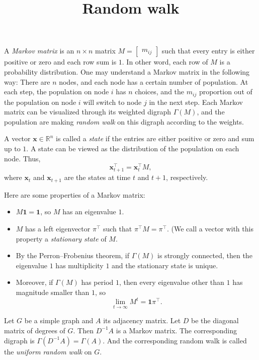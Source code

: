 \documentclass{article}
\title{Random walk}
\date{\vspace{-1cm}}
\newcommand{\trans}{^\top}
\newcommand{\bone}{\mathbf{1}}
\newcommand{\bx}{\mathbf{x}}
\theoremstyle{definition}
\begin{document}
\maketitle
\large

A \emph{Markov matrix} is an $n\times n $ matrix $M = \begin{bmatrix} m_{ij} \end{bmatrix}$ such that every entry is either positive or zero and each row sum is $1$.  In other word, each row of $M$ is a probability distribution.  One may understand a Markov matrix in the following way:  There are $n$ nodes, and each node has a certain number of population.  At each step, the population on node $i$ has $n$ choices, and the $m_{ij}$ proportion out of the population on node $i$ will switch to node $j$ in the next step.  Each Markov matrix can be visualized through its weighted digraph $\Gamma(M)$, and the population are making \emph{random walk} on this digraph according to the weights.

A vector $\bx\in\mathbb{R}^n$ is called a \emph{state} if the entries are either positive or zero and sum up to $1$.  A state can be viewed as the distribution of the population on each node.  Thus, 
\[\bx_{t+1}\trans = \bx_t\trans M,\]
where $\bx_t$ and $\bx_{t+1}$ are the states at time $t$ and $t+1$, respectively.

Here are some properties of a Markov matrix:
\begin{itemize}
\item $M\bone = \bone$, so $M$ has an eigenvalue $1$.  
\item $M$ has a left eigenvector $\pi\trans$ such that $\pi\trans M = \pi\trans$.  (We call a vector with this property a \emph{stationary state} of $M$.  
\item By the Perron--Frobenius theorem, if $\Gamma(M)$ is strongly connected, then the eigenvalue $1$ has multiplicity $1$ and the stationary state is unique.  
\item Moreover, if $\Gamma(M)$ has period $1$, then every eigenvalue other than $1$ has magnitude smaller than $1$, so 
\[\lim_{t\rightarrow\infty} M^t = \bone\pi\trans.\]
\end{itemize}

Let $G$ be a simple graph and $A$ its adjacency matrix.  Let $D$ be the diagonal matrix of degrees of $G$.  Then $D^{-1}A$ is a Markov matrix.  The corresponding digraph is $\Gamma(D^{-1}A) = \Gamma(A)$.  And the corresponding random walk is called the \emph{uniform random walk} on $G$.  
\end{document}
